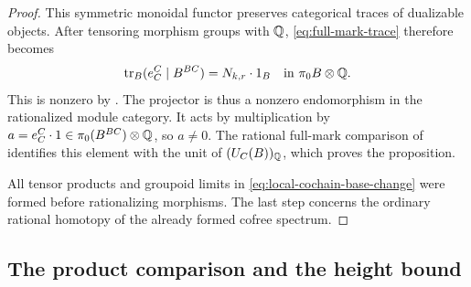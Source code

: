 \begin{proof}
This symmetric monoidal functor preserves categorical traces of
dualizable objects.  After tensoring morphism groups with \(\mathbb Q\),
\eqref{eq:full-mark-trace} therefore becomes
\[
 \operatorname{tr}_B(e_C^C\mid B^{BC})=N_{k,r}\cdot1_B
       \quad\text{in }\pi_0B\otimes\mathbb Q.
\]
This is nonzero by .  The projector is thus a
nonzero endomorphism in the rationalized module category.  It acts by
multiplication by
\(a=e_C^C\cdot1\in\pi_0(B^{BC})\otimes\mathbb Q\), so \(a\ne0\).
The rational full-mark comparison of
 identifies this element with the
unit of \((U_C(B))_{\mathbb Q}\), which proves the proposition.

All tensor products and groupoid limits in
\eqref{eq:local-cochain-base-change} were formed before rationalizing
morphisms.  The last step concerns the ordinary rational homotopy of
the already formed cofree spectrum.
\end{proof}

\subsection{The product comparison and the height bound}

